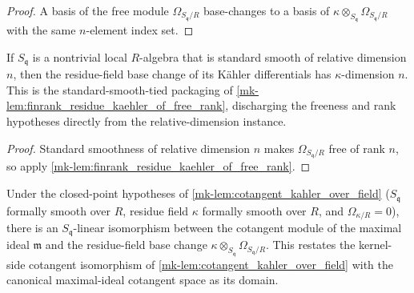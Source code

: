\begin{proof}
  A basis of the free module \(\Omega_{S_{\mathfrak q}/R}\) base-changes to a
  basis of \(\kappa \otimes_{S_{\mathfrak q}}\Omega_{S_{\mathfrak q}/R}\)
  with the same \(n\)-element index set.
\end{proof}

\begin{lemma}
  \label{mk-lem:finrank_residue_kaehler_of_standardSmooth_reldim}

  If \(S_{\mathfrak q}\) is a nontrivial local \(R\)-algebra that is standard smooth
  of relative dimension \(n\), then the residue-field base change of its K\"ahler
  differentials has \(\kappa\)-dimension \(n\). This is the standard-smooth-tied
  packaging of \ref{mk-lem:finrank_residue_kaehler_of_free_rank}, discharging the
  freeness and rank hypotheses directly from the relative-dimension instance.
\end{lemma}

\begin{proof}
  Standard smoothness of relative dimension \(n\) makes
  \(\Omega_{S_{\mathfrak q}/R}\) free of rank \(n\), so apply
  \ref{mk-lem:finrank_residue_kaehler_of_free_rank}.
\end{proof}

\begin{lemma}
  \label{mk-lem:cotangent_iso_maximalIdeal_residue_kaehler}

  Under the closed-point hypotheses of \ref{mk-lem:cotangent_kahler_over_field}
  (\(S_{\mathfrak q}\) formally smooth over \(R\), residue field \(\kappa\) formally
  smooth over \(R\), and \(\Omega_{\kappa/R} = 0\)), there is an
  \(S_{\mathfrak q}\)-linear isomorphism between the cotangent module of the maximal
  ideal \(\mathfrak m\) and the residue-field base change
  \(\kappa \otimes_{S_{\mathfrak q}} \Omega_{S_{\mathfrak q}/R}\). This restates the
  kernel-side cotangent isomorphism of \ref{mk-lem:cotangent_kahler_over_field} with the
  canonical maximal-ideal cotangent space as its domain.
\end{lemma}

